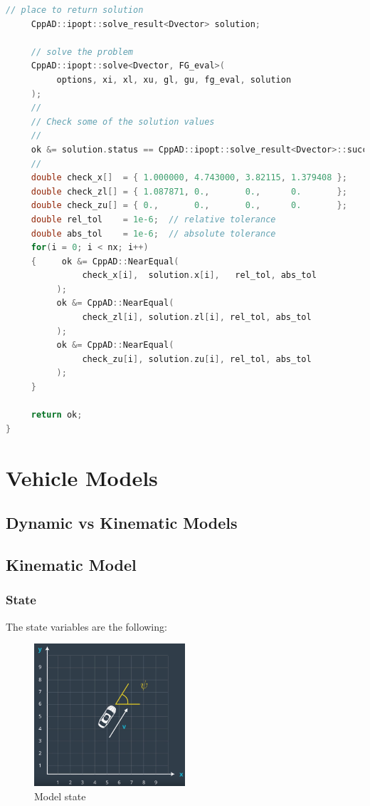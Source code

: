 \documentclass[11pt]{article}
\begin{document}
\begin{lstlisting}[language=C++, caption={Simple example with ipopt}]
     // place to return solution
     CppAD::ipopt::solve_result<Dvector> solution;

     // solve the problem
     CppAD::ipopt::solve<Dvector, FG_eval>(
          options, xi, xl, xu, gl, gu, fg_eval, solution
     );
     //
     // Check some of the solution values
     //
     ok &= solution.status == CppAD::ipopt::solve_result<Dvector>::success;
     //
     double check_x[]  = { 1.000000, 4.743000, 3.82115, 1.379408 };
     double check_zl[] = { 1.087871, 0.,       0.,      0.       };
     double check_zu[] = { 0.,       0.,       0.,      0.       };
     double rel_tol    = 1e-6;  // relative tolerance
     double abs_tol    = 1e-6;  // absolute tolerance
     for(i = 0; i < nx; i++)
     {     ok &= CppAD::NearEqual(
               check_x[i],  solution.x[i],   rel_tol, abs_tol
          );
          ok &= CppAD::NearEqual(
               check_zl[i], solution.zl[i], rel_tol, abs_tol
          );
          ok &= CppAD::NearEqual(
               check_zu[i], solution.zu[i], rel_tol, abs_tol
          );
     }

     return ok;
}


\end{lstlisting}

\section{Vehicle Models}

\subsection{Dynamic vs Kinematic Models}

\subsection{Kinematic Model}

\subsubsection{State}

The state variables are the following:

\begin{figure}[h]
    \centering
    \includegraphics[width=0.5\textwidth]{state}
    \caption{Model state}
    \label{fig:state}
\end{figure}
\FloatBarrier
\end{document}
